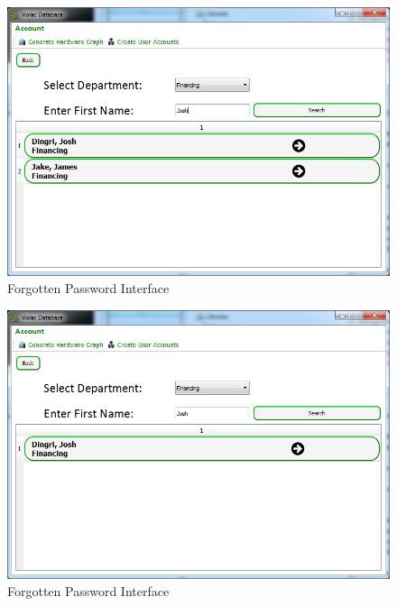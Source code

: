 \begin{figure}[H]
    \includegraphics[width=\textwidth]{./Testing/Images/BeforeSearch.png}
    \caption{Forgotten Password Interface} \label{fig:BeforeSearch}
\end{figure}

\begin{figure}[H]
    \includegraphics[width=\textwidth]{./Testing/Images/AfterSearch.png}
    \caption{Forgotten Password Interface} \label{fig:AfterSearch}
\end{figure}

